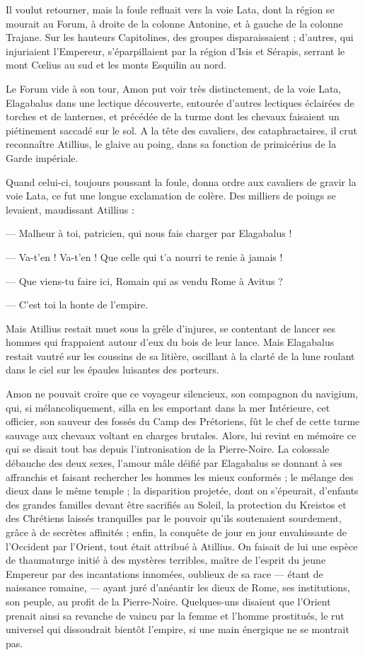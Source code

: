 \documentclass[a4paper, 11pt, oneside, polutonikogreek, french]{article}
\begin{document}
Il voulut retourner, mais la foule refluait vers la voie Lata, dont la région se mourait au Forum, à droite de la colonne Antonine, et à gauche de la colonne Trajane. Sur les hauteurs Capitolines, des groupes disparaissaient ; d'autres, qui injuriaient l'Empereur, s'éparpillaient par la région d'Isis et Sérapis, serrant le mont Cœlius au sud et les monts Esquilin au nord.

Le Forum vide à son tour, Amon put voir très distinctement, de la voie Lata, Elagabalus dans une lectique découverte, entourée d'autres lectiques éclairées de torches et de lanternes, et précédée de la turme dont les chevaux faisaient un piétinement saccadé sur le sol. A la tête des cavaliers, des cataphractaires, il crut reconnaître Atillius, le glaive au poing, dans sa fonction de primicérius de la Garde impériale.

Quand celui-ci, toujours poussant la foule, donna ordre aux cavaliers de gravir la voie Lata, ce fut une longue exclamation de colère. Des milliers de poings se levaient, maudissant Atillius :

--- Malheur à toi, patricien, qui nous fais charger par Elagabalus !

--- Va-t'en ! Va-t'en ! Que celle qui t'a nourri te renie à jamais !

--- Que viens-tu faire ici, Romain qui as vendu Rome à Avitus ?

--- C'est toi la honte de l'empire.

Mais Atillius restait muet sous la grêle d'injures, se contentant de lancer ses hommes qui frappaient autour d'eux du bois de leur lance. Mais Elagabalus restait vautré sur les coussins de sa litière, oscillant à la clarté de la lune roulant dans le ciel sur les épaules luisantes des porteurs.

Amon ne pouvait croire que ce voyageur silencieux, son compagnon du navigium, qui, si mélancoliquement, silla en les emportant dans la mer Intérieure, cet officier, son sauveur des fossés du Camp des Prétoriens, fût le chef de cette turme sauvage aux chevaux voltant en charges brutales. Alors, lui revint en mémoire ce qui se disait tout bas depuis l'intronisation de la Pierre-Noire. La colossale débauche des deux sexes, l'amour mâle déifié par Elagabalus se donnant à ses affranchis et faisant rechercher les hommes les mieux conformés ; le mélange des dieux dans le même temple ; la disparition projetée, dont on s'épeurait, d'enfants des grandes familles devant être sacrifiés au Soleil, la protection du Kreistos et des Chrétiens laissés tranquilles par le pouvoir qu'ils soutenaient sourdement, grâce à de secrètes affinités ; enfin, la conquête de jour en jour envahissante de l'Occident par l'Orient, tout était attribué à Atillius. On faisait de lui une espèce de thaumaturge initié à des mystères terribles, maître de l'esprit du jeune Empereur par des incantations innomées, oublieux de sa race --- étant de naissance romaine, --- ayant juré d'anéantir les dieux de Rome, ses institutions, son peuple, au profit de la Pierre-Noire. Quelques-uns disaient que l'Orient prenait ainsi sa revanche de vaincu par la femme et l'homme prostitués, le rut universel qui dissoudrait bientôt l'empire, si une main énergique ne se montrait pas.
\end{document}
